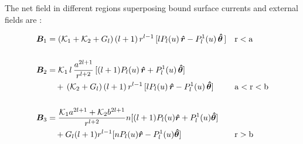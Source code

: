 The net field in different regions superposing bound surface currents and external fields are : 

\begin{align}
    \bm B_1 &=(\mathcal{K}_1+\mathcal{K}_2+G_l) \, (l+1)\, r^{l-1} \, [l P_l(u) \, \bm{\hat{r}} -  P_l^1(u)  \, \bm{\hat{\theta}} \, ] && \mathrm{r<a}\label{r<R}\\[15pt]
    \bm B_2 &=\mathcal{K}_1 \, l\, \frac{a^{2l+1}}{r^{l+2}} \,[(l+1) P_l(u) \, \bm{\hat{r}} +  P_l^1(u)  \, \bm{\hat{\theta}} ]\notag\\
&\quad +\, (\mathcal{K}_2+G_l) \, (l+1)\, r^{l-1} \, [l P_l(u) \, \bm{\hat{r}} -  P_l^1(u)  \, \bm{\hat{\theta}} ] &&\mathrm{a<r<b}\label{R<r<R+t}\\[15pt]
    \bm B_3 &= \frac{\mathcal{K}_1a^{2l+1} + \mathcal{K}_2 b^{2l+1} }{r^{l+2}} n [(l+1) P_l(u) \bm{\hat{r}} +  P_l^1(u)  \bm{\hat{\theta}} ]  \notag\\
&\quad  + G_l (l+1) r^{l-1} [n P_l(u) \bm{\hat{r}} - P_l^1(u)  \bm{\hat{\theta}} ]&& \mathrm{r>b}\label{r>R}
\end{align}
%
%

